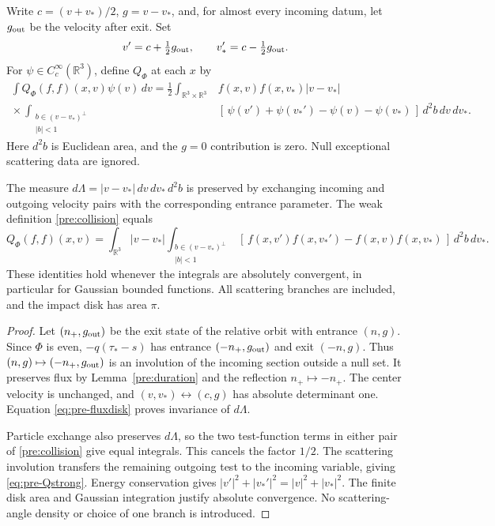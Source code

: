 \begin{definition}
Write $c=(v+v_*)/2$, $g=v-v_*$, and, for almost every incoming datum,
let $g_{\rm out}$ be the velocity after exit. Set
\[
 v'=c+\tfrac12g_{\rm out},\qquad
 v_*'=c-\tfrac12g_{\rm out}.
\]
For $\psi\in C_c^\infty(\mathbb R^3)$, define $Q_\Phi$ at each $x$ by
\begin{equation}\label{pre:collision}
 \begin{split}
 \int Q_\Phi(f,f)(x,v)\psi(v)\,dv
 =\frac12\int_{\mathbb R^3\times\mathbb R^3}
 & f(x,v)f(x,v_*)|v-v_*|\\
 {}\times\int_{\substack{b\in(v-v_*)^\perp\\|b|<1}}
 &[\,\psi(v')+\psi(v_*')-\psi(v)-\psi(v_*)\,]\,
                         d^2b\,dv\,dv_* .
 \end{split}
\end{equation}
Here $d^2b$ is Euclidean area, and the $g=0$ contribution is zero.
Null exceptional scattering data are ignored.
\end{definition}

\begin{lemma}\label{pre:operator}
The measure $d\Lambda=|v-v_*|\,dv\,dv_*\,d^2b$ is preserved by
exchanging incoming and outgoing velocity pairs with the corresponding
entrance parameter. The weak definition \eqref{pre:collision} equals
\begin{equation}\label{eq:pre-Qstrong}
 Q_\Phi(f,f)(x,v)=
 \int_{\mathbb R^3}|v-v_*|
 \int_{\substack{b\in(v-v_*)^\perp\\|b|<1}}
 [\,f(x,v')f(x,v_*')-f(x,v)f(x,v_*)\,]\,d^2b\,dv_* .
\end{equation}
These identities hold whenever the integrals are absolutely convergent,
in particular for Gaussian bounded functions. All scattering branches
are included, and the impact disk has area $\pi$.
\end{lemma}

\begin{proof}
Let $(n_+,g_{\rm out})$ be the exit state of the relative orbit with
entrance $(n,g)$. Since $\Phi$ is even, $-q(\tau_*-s)$ has entrance
$(-n_+,g_{\rm out})$ and exit $(-n,g)$.
Thus $(n,g)\mapsto(-n_+,g_{\rm out})$ is an involution of the incoming
section outside a null set. It preserves flux by
Lemma~\ref{pre:duration} and the reflection $n_+\mapsto-n_+$.
The center velocity is unchanged, and
$(v,v_*)\leftrightarrow(c,g)$ has absolute determinant one.
Equation \eqref{eq:pre-fluxdisk} proves invariance of $d\Lambda$.

Particle exchange also preserves $d\Lambda$, so the two test-function
terms in either pair of \eqref{pre:collision} give equal integrals.
This cancels the factor $1/2$. The scattering involution transfers
the remaining outgoing test to the incoming variable, giving
\eqref{eq:pre-Qstrong}.
Energy conservation gives
$|v'|^2+|v_*'|^2=|v|^2+|v_*|^2$.
The finite disk area and Gaussian integration justify absolute
convergence. No scattering-angle density or choice of one branch is
introduced.
\end{proof}

